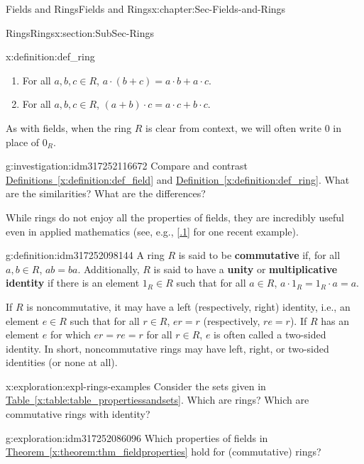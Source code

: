 \documentclass[oneside,10pt,]{book}
\newcommand{\xreffont}{\relax}
\newcommand{\terminology}[1]{\textbf{#1}}
\numberwithin{equation}{section}
\begin{document}
\begin{chapterptx}{Fields and Rings}{}{Fields and Rings}{}{}{x:chapter:Sec-Fields-and-Rings}
\begin{sectionptx}{Rings}{}{Rings}{}{}{x:section:SubSec-Rings}
\begin{definition}{}{x:definition:def_ring}
\begin{enumerate}
\item{}For all \(a,b,c\in R\), \(a\cdot (b+c) = a\cdot b + a\cdot c\).%
\item{}For all \(a,b,c\in R\), \((a+b)\cdot c = a\cdot c + b\cdot c\).%
\end{enumerate}
As with fields, when the ring \(R\) is clear from context, we will often write \(0\) in place of \(0_R\).%
\end{definition}
\begin{investigation}{}{g:investigation:idm317252116672}%
Compare and contrast \hyperref[x:definition:def_field]{Definitions~{\xreffont\ref{x:definition:def_field}}} and \hyperref[x:definition:def_ring]{Definition~{\xreffont\ref{x:definition:def_ring}}}. What are the similarities? What are the differences?%
\end{investigation}
While rings do not enjoy all the properties of fields, they are incredibly useful even in applied mathematics (see, e.g., \hyperlink{x:biblio:Curto2013}{[{\xreffont 2.2.1}]} for one recent example).%
\begin{definition}{}{g:definition:idm317252098144}%
%
%
%
A ring \(R\) is said to be \terminology{commutative} if, for all \(a,b\in R\), \(ab = ba\). Additionally, \(R\) is said to have a \terminology{unity} or \terminology{multiplicative identity} if there is an element \(1_R\in R\) such that for all \(a\in R\), \(a \cdot 1_R = 1_R \cdot a= a\).%
\end{definition}
If \(R\) is noncommutative, it may have a left (respectively, right) identity, i.e., an element \(e\in R\) such that for all \(r\in R\), \(er = r\) (respectively, \(re = r\)). If \(R\) has an element \(e\) for which \(er = re = r\) for all \(r\in R\), \(e\) is often called a two-sided identity. In short, noncommutative rings may have left, right, or two-sided identities (or none at all).%
\begin{exploration}{}{x:exploration:expl-rings-examples}%
Consider the sets given in \hyperref[x:table:table_propertiessandsets]{Table~{\xreffont\ref{x:table:table_propertiessandsets}}}. Which are rings? Which are commutative rings with identity?%
\end{exploration}
\begin{exploration}{}{g:exploration:idm317252086096}%
Which properties of fields in \hyperref[x:theorem:thm_fieldproperties]{Theorem~{\xreffont\ref{x:theorem:thm_fieldproperties}}} hold for (commutative) rings?%
\end{exploration}

\end{sectionptx}
\end{chapterptx}
\end{document}
